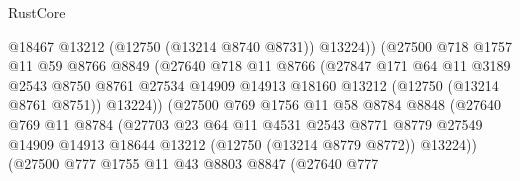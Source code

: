 \begin{lexlean}{RustCore}
\begin{coremodule}
                                @18467
                                @13212
                                (@12750 (@13214 @8740 @8731))
                                @13224))
                            (@27500
                              @718
                              @1757
                              @11
                              @59
                              @8766
                              @8849
                              (@27640
                                @718
                                @11
                                @8766
                                (@27847
                                  @171
                                  @64
                                  @11
                                  @3189
                                  @2543
                                  @8750
                                  @8761
                                  @27534
                                  @14909
                                  @14913
                                  @18160
                                  @13212
                                  (@12750 (@13214 @8761 @8751))
                                  @13224))
                              (@27500
                                @769
                                @1756
                                @11
                                @58
                                @8784
                                @8848
                                (@27640
                                  @769
                                  @11
                                  @8784
                                  (@27703
                                    @23
                                    @64
                                    @11
                                    @4531
                                    @2543
                                    @8771
                                    @8779
                                    @27549
                                    @14909
                                    @14913
                                    @18644
                                    @13212
                                    (@12750 (@13214 @8779 @8772))
                                    @13224))
                                (@27500
                                  @777
                                  @1755
                                  @11
                                  @43
                                  @8803
                                  @8847
                                  (@27640
                                    @777

\end{coremodule}
\end{lexlean}
